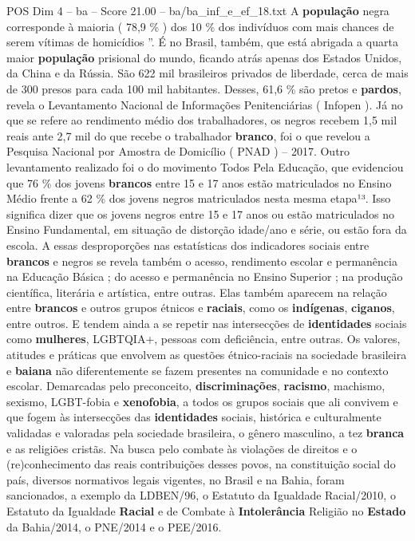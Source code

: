 \begin{textsample}{POS Dim 4 – ba – Score 21.00 – ba/ba\_inf\_e\_ef\_18.txt}
A \textbf{população} negra corresponde à maioria ( 78,9 \% ) dos 10 \% dos indivíduos com mais chances de serem vítimas de homicídios ”.
É no Brasil, também, que está abrigada a quarta maior \textbf{população} prisional do mundo, ficando atrás apenas dos Estados Unidos, da China e da Rússia.
São 622 mil brasileiros privados de liberdade, cerca de mais de 300 presos para cada 100 mil habitantes.
Desses, 61,6 \% são pretos e \textbf{pardos}, revela o Levantamento Nacional de Informações Penitenciárias ( Infopen ).
Já no que se refere ao rendimento médio dos trabalhadores, os negros recebem 1,5 mil reais ante 2,7 mil do que recebe o trabalhador \textbf{branco}, foi o que revelou a Pesquisa Nacional por Amostra de Domicílio ( PNAD ) – 2017.
Outro levantamento realizado foi o do movimento Todos Pela Educação, que evidenciou que 76 \% dos jovens \textbf{brancos} entre 15 e 17 anos estão matriculados no Ensino Médio frente a 62 \% dos jovens negros matriculados nesta mesma etapa¹³.
Isso significa dizer que os jovens negros entre 15 e 17 anos ou estão matriculados no Ensino Fundamental, em situação de distorção idade/ano e série, ou estão fora da escola.
A essas desproporções nas estatísticas dos indicadores sociais entre \textbf{brancos} e negros se revela também o acesso, rendimento escolar e permanência na Educação Básica ; do acesso e permanência no Ensino Superior ; na produção científica, literária e artística, entre outras.
Elas também aparecem na relação entre \textbf{brancos} e outros grupos étnicos e \textbf{raciais}, como os \textbf{indígenas}, \textbf{ciganos}, entre outros.
E tendem ainda a se repetir nas intersecções de \textbf{identidades} sociais como \textbf{mulheres}, LGBTQIA+, pessoas com deficiência, entre outras.
Os valores, atitudes e práticas que envolvem as questões étnico-raciais na sociedade brasileira e \textbf{baiana} não diferentemente se fazem presentes na comunidade e no contexto escolar.
Demarcadas pelo preconceito, \textbf{discriminações}, \textbf{racismo}, machismo, sexismo, LGBT-fobia e \textbf{xenofobia}, a todos os grupos sociais que ali convivem e que fogem às intersecções das \textbf{identidades} sociais, histórica e culturalmente validadas e valoradas pela sociedade brasileira, o gênero masculino, a tez \textbf{branca} e as religiões cristãs.
Na busca pelo combate às violações de direitos e o (re)conhecimento das reais contribuições desses povos, na constituição social do país, diversos normativos legais vigentes, no Brasil e na Bahia, foram sancionados, a exemplo da LDBEN/96, o Estatuto da Igualdade Racial/2010, o Estatuto da Igualdade \textbf{Racial} e de Combate à \textbf{Intolerância} Religião no \textbf{Estado} da Bahia/2014, o PNE/2014 e o PEE/2016.

\end{textsample}
